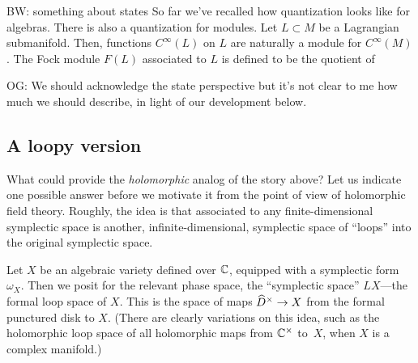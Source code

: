 \documentclass[11pt]{amsart}
\def\brian#1{{\textcolor{blue!75!red}{BW: {#1}}}}
\def\owen#1{{\textcolor{violet!50!black}{OG: {#1}}}}
\begin{document}
\brian{something about states}
So far we've recalled how quantization looks like for algebras.
There is also a quantization for modules.
Let $L \subset M$ be a Lagrangian submanifold.
Then, functions $C^\infty(L)$ on $L$ are naturally a module for $C^\infty(M)$.
The Fock module $F(L)$ associated to $L$ is defined to be the quotient of 

\owen{We should acknowledge the state perspective but it's not clear to me how much we should describe, in light of our development below.}

\subsection{A loopy version}

What could provide the {\em holomorphic} analog of the story above?
Let us indicate one possible answer before we motivate it from the point of view of holomorphic field theory.
Roughly, the idea is that associated to any finite-dimensional symplectic space is another, infinite-dimensional, symplectic space of ``loops'' into the original symplectic space.


Let $X$ be an algebraic variety defined over $\CC$, equipped with a symplectic form $\omega_X$.
Then we posit for the relevant phase space, the ``symplectic space'' $LX$---the formal loop space of $X$.
This is the space of maps $\Hat{D}^\times \to X$ from the formal punctured disk to $X$.
%
(There are clearly variations on this idea, such as the holomorphic loop space of all holomorphic maps from $\CC^\times$ to~$X$, when $X$ is a complex manifold.)
\end{document}
